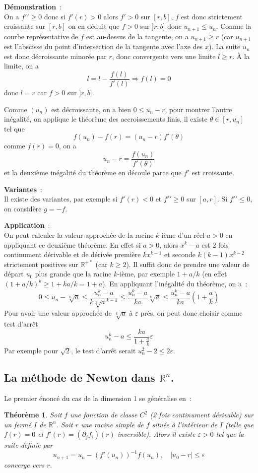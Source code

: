 \documentclass[a4paper,11pt]{article}
\newtheorem{thm}{Théorème}
\begin{document}
\begin{giacjshere}
{\bf Démonstration}~:\\
On a $f'{'} \geq 0$ donc si $f'(r)>0$ alors $f'>0$
sur $[r,b]$, $f$ est donc strictement croissante sur $[r,b]$
on en déduit que $f>0$ sur $]r,b]$ donc $u_{n+1} \leq u_n$.
Comme la courbe représentative de $f$ est au-dessus de la tangente,
on a $u_{n+1} \geq r$ (car $u_{n+1}$ est l'abscisse du point
d'intersection de la tangente avec l'axe des $x$). 
La suite $u_n$ est donc décroissante minorée par $r$, donc convergente
vers une limite $l\geq r$. \`A la limite, on a 
\[ l=l-\frac{f(l)}{f'(l)} \Rightarrow f(l)=0 \]
donc $l=r$ car $f>0$ sur $]r,b]$.

Comme $(u_n)$ est d\'ecroissante, on a bien $0 \leq u_n -r$,
pour montrer l'autre in\'egalit\'e, on applique le th\'eor\`eme
des accroissements finis, il existe $\theta \in [r,u_n]$ tel que
\[ f(u_n)-f(r)=(u_n-r)f'(\theta) \]
comme $f(r)=0$, on a
\[ u_n-r = \frac{f(u_n)}{f'(\theta)} \]
et la deuxi\`eme in\'egalit\'e du th\'eor\`eme
en d\'ecoule parce que $f'$ est croissante.

{\bf Variantes}~:\\
Il existe des variantes, par exemple si $f'(r)<0$ et $f'{'} \geq 0$
sur $[a,r]$. Si $f'{'} \leq 0$, on considère $g=-f$.

{\bf Application}~:\\
On peut calculer la valeur approch\'ee de la 
racine $k$-i\`eme d'un r\'eel $a>0$ en appliquant ce deuxi\`eme
th\'eor\`eme. En effet si
$a>0$, alors $x^k-a$ est 2 fois continument d\'erivable et 
de d\'eriv\'ee premi\`ere $kx^{k-1} $ et
seconde $k(k-1)x^{k-2}$ strictement positives sur $\mathbb{R}^{+\ast}$ (car $k \geq 2$).
Il suffit donc de prendre une valeur de d\'epart $u_0$ plus grande que
la racine $k$-i\`eme, par exemple $1+a/k$ (en effet
$(1+a/k)^k \geq 1+k a/k=1+a$).
En appliquant l'in\'egalit\'e du th\'eor\`eme, on a~:
\[ 0 \leq u_n - \sqrt[k]{a} \leq  
\frac{u_n^k - a}{k\sqrt[k]{a}^{k-1} }
\leq \frac{u_n^k-a}{ka}  \sqrt[k]{a}
\leq \frac{u_n^k-a}{ka} (1+\frac{a}{k})
\]
Pour avoir une valeur approch\'ee de $\sqrt[k]{a}$ \`a $\varepsilon$ pr\`es,
on peut donc choisir comme test d'arr\^et 
\[ u_n^k -a \leq \frac{ka}{1+\frac{a}{k}} \varepsilon \]
Par exemple pour $\sqrt{2}$, le test d'arr\^et serait 
$u_n^2-2 \leq 2 \varepsilon$.

\subsection{La m\'ethode de Newton dans $\mathbb{R}^n$.}
Le premier \'enonc\'e du cas de la dimension 1 se g\'en\'eralise en~:
\begin{thm} 
Soit $f$ une fonction de classe $C^2$ (2 fois continument d\'erivable)
sur un ferm\'e $I$ de $\mathbb{R}^n$. Soit $r$ une racine simple de $f$
situ\'ee \`a l'int\'erieur de $I$
(telle que $f(r)=0$ et $f'(r)=(\partial_j f_i)(r)$ inversible). 
Alors il existe $\varepsilon>0$
tel que la suite d\'efinie par
\[ u_{n+1} = u_n -(f'(u_n) )^{-1}f(u_n), \quad |u_0-r| \leq \varepsilon \]
converge vers $r$.


\end{thm}
\end{giacjshere}
\end{document}
